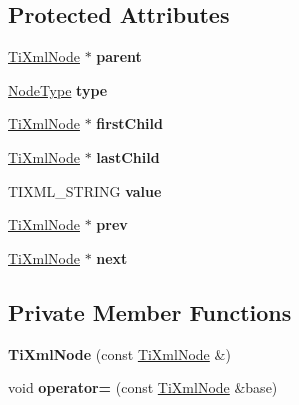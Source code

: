 \subsection*{\-Protected \-Attributes}
\begin{DoxyCompactItemize}
\item 
\hypertarget{class_ti_xml_node_a662c4de61244e4fa5bd4e2d8c63143a5}{\hyperlink{class_ti_xml_node}{\-Ti\-Xml\-Node} $\ast$ {\bfseries parent}}\label{class_ti_xml_node_a662c4de61244e4fa5bd4e2d8c63143a5}

\item 
\hypertarget{class_ti_xml_node_a2619c6379181c16ba95ae6922e2ca839}{\hyperlink{class_ti_xml_node_a836eded4920ab9e9ef28496f48cd95a2}{\-Node\-Type} {\bfseries type}}\label{class_ti_xml_node_a2619c6379181c16ba95ae6922e2ca839}

\item 
\hypertarget{class_ti_xml_node_af749fb7f22010b80e8f904c32653d50e}{\hyperlink{class_ti_xml_node}{\-Ti\-Xml\-Node} $\ast$ {\bfseries first\-Child}}\label{class_ti_xml_node_af749fb7f22010b80e8f904c32653d50e}

\item 
\hypertarget{class_ti_xml_node_a5b30756d21b304580d22a841ec9d61f8}{\hyperlink{class_ti_xml_node}{\-Ti\-Xml\-Node} $\ast$ {\bfseries last\-Child}}\label{class_ti_xml_node_a5b30756d21b304580d22a841ec9d61f8}

\item 
\hypertarget{class_ti_xml_node_aead528b3cedc33c16a6c539872c7cc8b}{\-T\-I\-X\-M\-L\-\_\-\-S\-T\-R\-I\-N\-G {\bfseries value}}\label{class_ti_xml_node_aead528b3cedc33c16a6c539872c7cc8b}

\item 
\hypertarget{class_ti_xml_node_a9c5370ea2cbfd9f0e0f7b30a57fd68f5}{\hyperlink{class_ti_xml_node}{\-Ti\-Xml\-Node} $\ast$ {\bfseries prev}}\label{class_ti_xml_node_a9c5370ea2cbfd9f0e0f7b30a57fd68f5}

\item 
\hypertarget{class_ti_xml_node_a2f329cc993d2d34df76e17dcbb776b45}{\hyperlink{class_ti_xml_node}{\-Ti\-Xml\-Node} $\ast$ {\bfseries next}}\label{class_ti_xml_node_a2f329cc993d2d34df76e17dcbb776b45}

\end{DoxyCompactItemize}
\subsection*{\-Private \-Member \-Functions}
\begin{DoxyCompactItemize}
\item 
\hypertarget{class_ti_xml_node_a5ca3233e05032d121b13fac8273de68d}{{\bfseries \-Ti\-Xml\-Node} (const \hyperlink{class_ti_xml_node}{\-Ti\-Xml\-Node} \&)}\label{class_ti_xml_node_a5ca3233e05032d121b13fac8273de68d}

\item 
\hypertarget{class_ti_xml_node_a9eb62a8d95b8a98ec2df481cc9e5a7e2}{void {\bfseries operator=} (const \hyperlink{class_ti_xml_node}{\-Ti\-Xml\-Node} \&base)}\label{class_ti_xml_node_a9eb62a8d95b8a98ec2df481cc9e5a7e2}

\end{DoxyCompactItemize}

